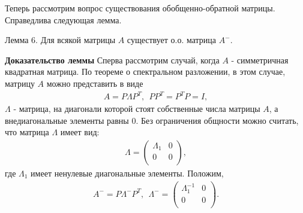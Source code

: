 \documentclass[10pt,slidestop,usepdftitle=false]{beamer}
\begin{document}
\begin{frame}
Теперь рассмотрим вопрос существования обобщенно-обратной матрицы.
Справедлива следующая лемма.
\begin{lemma}{Лемма 6.}
Для всякой матрицы $A$ существует о.о. матрица $A^{-}$.
 \label{lemGIM2}
\end{lemma}
{\bf Доказательство леммы } Сперва рассмотрим случай,
когда $A$ - симметричная квадратная матрица. По теореме о
спектральном разложении, в этом случае, матрицу $A$ можно
представить в виде
\begin{eqnarray*}
A=P\Lambda P^T, \ \ PP^T=P^TP=I,
\end{eqnarray*}
$\Lambda$ - матрица, на диагонали которой стоят собственные числа
матрицы $A$,
 а внедиагональные элементы равны 0.
Без ограничения общности можно считать, что матрица $\Lambda$ имеет
вид:
\begin{eqnarray*}
\Lambda=\left(
          \begin{array}{cc}
            \Lambda_1 & 0 \\
            0 & 0 \\
          \end{array}
        \right),
\end{eqnarray*}
где $\Lambda_1$ имеет ненулевые диагональные элементы. Положим,
\begin{eqnarray*}
A^{-}=P\Lambda^{-}P^T,\ \  \Lambda^{-}=\left(
          \begin{array}{cc}
            \Lambda_1^{-1} & 0 \\
            0 & 0 \\
          \end{array}
        \right).
\end{eqnarray*}
\end{frame}
\end{document}
